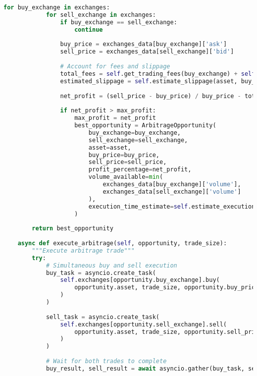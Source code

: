 \documentclass[12pt,a4paper]{article}
\begin{document}
\begin{lstlisting}[language=Python, caption=Multi-Exchange Arbitrage System]
        for buy_exchange in exchanges:
            for sell_exchange in exchanges:
                if buy_exchange == sell_exchange:
                    continue
                
                buy_price = exchanges_data[buy_exchange]['ask']
                sell_price = exchanges_data[sell_exchange]['bid']
                
                # Account for fees and slippage
                total_fees = self.get_trading_fees(buy_exchange) + self.get_trading_fees(sell_exchange)
                estimated_slippage = self.estimate_slippage(asset, buy_exchange, sell_exchange)
                
                net_profit = (sell_price - buy_price) / buy_price - total_fees - estimated_slippage
                
                if net_profit > max_profit:
                    max_profit = net_profit
                    best_opportunity = ArbitrageOpportunity(
                        buy_exchange=buy_exchange,
                        sell_exchange=sell_exchange,
                        asset=asset,
                        buy_price=buy_price,
                        sell_price=sell_price,
                        profit_percentage=net_profit,
                        volume_available=min(
                            exchanges_data[buy_exchange]['volume'],
                            exchanges_data[sell_exchange]['volume']
                        ),
                        execution_time_estimate=self.estimate_execution_time(buy_exchange, sell_exchange)
                    )
        
        return best_opportunity
    
    async def execute_arbitrage(self, opportunity, trade_size):
        """Execute arbitrage trade"""
        try:
            # Simultaneous buy and sell execution
            buy_task = asyncio.create_task(
                self.exchanges[opportunity.buy_exchange].buy(
                    opportunity.asset, trade_size, opportunity.buy_price
                )
            )
            
            sell_task = asyncio.create_task(
                self.exchanges[opportunity.sell_exchange].sell(
                    opportunity.asset, trade_size, opportunity.sell_price
                )
            )
            
            # Wait for both trades to complete
            buy_result, sell_result = await asyncio.gather(buy_task, sell_task)
            

\end{lstlisting}
\end{document}
